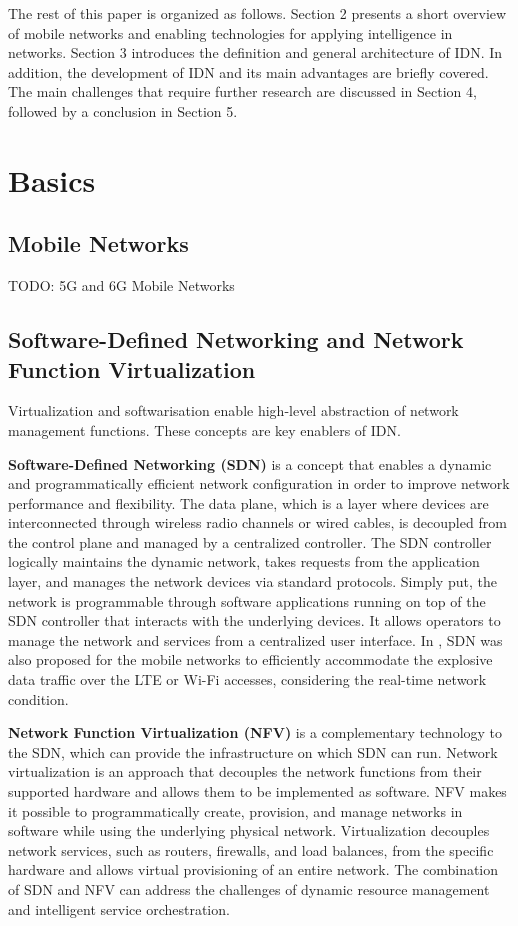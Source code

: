The rest of this paper is organized as follows. Section 2 presents a short overview of mobile networks and enabling technologies for applying intelligence in networks. Section 3 introduces the definition and general architecture of IDN. In addition, the development of IDN and its main advantages are briefly covered. The main challenges that require further research are discussed in Section 4, followed by a conclusion in Section 5.

\section{Basics}
\label{sec:Basics}

\subsection{Mobile Networks}
TODO: 5G and 6G Mobile Networks


\subsection{Software-Defined Networking and Network Function Virtualization}

Virtualization and softwarisation enable high-level abstraction of network management functions. These concepts are key enablers of IDN.

\textbf{Software-Defined Networking (SDN)} is a concept that enables a dynamic and programmatically efficient network configuration in order to improve network performance and flexibility. The data plane, which is a layer where devices are interconnected through wireless radio channels or wired cables, is decoupled from the control plane and managed by a centralized controller\cite{Li2015}. The SDN controller logically maintains the dynamic network, takes requests from the application layer, and manages the network devices via standard protocols. Simply put, the network is programmable through software applications running on top of the SDN controller that interacts with the underlying devices. It allows operators to manage the network and services from a centralized user interface. In \cite{Amani2014}, SDN was also proposed for the mobile networks to efficiently accommodate the explosive data traffic over the LTE or Wi-Fi accesses, considering the real-time network condition.

\textbf{Network Function Virtualization (NFV)} is a complementary technology to the SDN, which can provide the infrastructure on which SDN can run. Network virtualization is an approach that decouples the network functions from their supported hardware and allows them to be implemented as software. NFV makes it possible to programmatically create, provision, and manage networks in software while using the underlying physical network. Virtualization decouples network services, such as routers, firewalls, and load balances, from the specific hardware and allows virtual provisioning of an entire network. The combination of SDN and NFV can address the challenges of dynamic resource management and intelligent service orchestration.\cite{Li2015}

